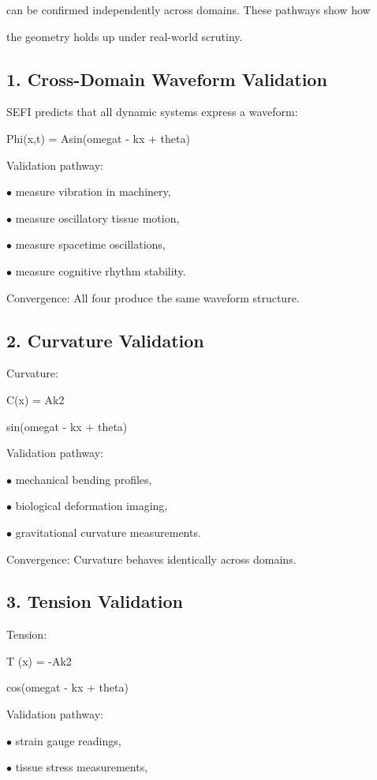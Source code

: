 \documentclass[10pt]{article}
\begin{document}
can be confirmed independently across domains. These pathways show how

the geometry holds up under real-world scrutiny.


\subsection*{1. Cross-Domain Waveform Validation}
SEFI predicts that all dynamic systems express a waveform:

Phi(x,t) = Asin(omegat - kx + theta)

Validation pathway:

\noindent $\bullet$ measure vibration in machinery,

\noindent $\bullet$ measure oscillatory tissue motion,

\noindent $\bullet$ measure spacetime oscillations,

\noindent $\bullet$ measure cognitive rhythm stability.

Convergence: All four produce the same waveform structure.

\subsection*{2. Curvature Validation}
Curvature:

C(x) = Ak2

sin(omegat - kx + theta)

Validation pathway:

\noindent $\bullet$ mechanical bending profiles,

\noindent $\bullet$ biological deformation imaging,

\noindent $\bullet$ gravitational curvature measurements.

Convergence: Curvature behaves identically across domains.

\subsection*{3. Tension Validation}
Tension:

T (x) = -Ak2

cos(omegat - kx + theta)

Validation pathway:

\noindent $\bullet$ strain gauge readings,


\noindent $\bullet$ tissue stress measurements,
\end{document}

